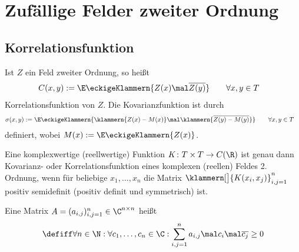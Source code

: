 
\chapter{Zufällige Felder zweiter Ordnung}
\section{Korrelationsfunktion}

\begin{erinnerungnr}\label{erinnerung3.1.1}
	Ist $Z$ ein Feld zweiter Ordnung, so heißt
	\begin{align*}
		C(x,y)
		&:=\E\eckigeKlammern{Z(x)\mal\overline{Z(y)}} \qquad\forall x,y\in T
	\end{align*}
	Korrelationsfunktion von $Z$. 
	Die Kovarianzfunktion ist durch 
	\begin{align*}
		\sigma(x,y)&:=\E\eckigeKlammern{\klammern{Z(x)-M(x)}\mal\klammern{\overline{Z(y)-M(y)}}}
		\qquad\forall x,y\in T
	\end{align*}
	definiert, wobei
	$M(x):=\E\eckigeKlammern{Z(x)}$.
\end{erinnerungnr}

\begin{satz}\label{satz3.1.2}
	Eine komplexwertige (reellwertige) Funktion $K\colon T\times T\to C(\R)$ ist genau dann Kovarianz- oder Korrelationsfunktion eines komplexen (reellen) Feldes 2. Ordnung, wenn für beliebige $x_1,\ldots,x_n$ die Matrix $\klammern[\big]{K(x_i,x_j)}_{i,j=1}^n$ positiv semidefinit (positiv definit und symmetrisch) ist.
\end{satz}

\begin{erinnerung}
	 Eine Matrix $A=(a_{i,j})_{i,j=1}^n\in\C^{n\times n}$ heißt 
	 \begin{align*}
	 	\defiff\forall n\in\N:\forall c_1,\ldots,c_n\in\C:\sum\limits_{i,j=1}^n a_{i,j}\mal c_i\mal\overline{c_j}\geq 0
	 \end{align*}
\end{erinnerung}

